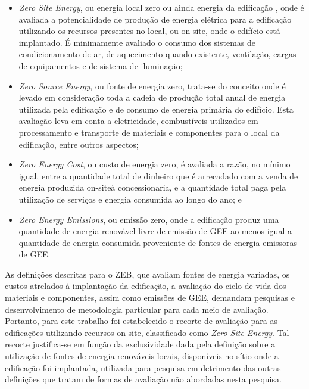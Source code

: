     \begin{itemize}
        \item \textit{Zero Site Energy}, ou energia local zero ou ainda energia da edificação \cite{U.S.DepartmentofEnergy-USDOE2015}, onde é avaliada a potencialidade de produção de energia elétrica para a edificação utilizando os recursos presentes no local, ou on-site, onde o edifício está implantado. É minimamente avaliado o consumo dos sistemas de condicionamento de ar, de aquecimento quando existente, ventilação, cargas de equipamentos e de sistema de iluminação;
        \item \textit{Zero Source Energy}, ou fonte de energia zero, trata-se do conceito onde é levado em consideração toda a cadeia de produção total anual de energia utilizada pela edificação e de consumo de energia primária do edifício. Esta avaliação leva em conta a eletricidade, combustíveis utilizados em processamento e transporte de materiais e componentes para o local da edificação, entre outros aspectos;
        \item \textit{Zero Energy Cost}, ou custo de energia zero, é avaliada a razão, no mínimo igual, entre a quantidade total de dinheiro que é arrecadado com a venda de energia produzida on-siteà concessionaria, e a quantidade total paga pela utilização de serviços e energia consumida ao longo do ano; e
        \item \textit{Zero Energy Emissions}, ou emissão zero, onde a edificação produz uma quantidade de energia renovável livre de emissão de GEE ao menos igual a quantidade de energia consumida proveniente de fontes de energia emissoras de GEE.
    \end{itemize}
As definições descritas para o ZEB, que avaliam fontes de energia variadas, os custos atrelados à implantação da edificação, a avaliação do ciclo de vida dos materiais e componentes, assim como emissões de GEE, demandam pesquisas e desenvolvimento de metodologia particular para cada meio de avaliação. Portanto, para este trabalho foi estabelecido o recorte de avaliação para as edificações utilizando recursos on-site, classificado como \textit{Zero Site Energy}. Tal recorte justifica-se em função da exclusividade dada pela definição sobre a utilização de fontes de energia renováveis locais, disponíveis no sítio onde a edificação foi implantada, utilizada para pesquisa em detrimento das outras definições que tratam de formas de avaliação não abordadas nesta pesquisa.\vspace*{0.3cm} \newline
